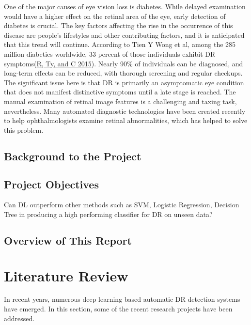 \documentclass[
]{article}
\begin{document}
One of the major causes of eye vision loss is diabetes. While delayed
examination would have a higher effect on the retinal area of the eye,
early detection of diabetes is crucial. The key factors affecting the
rise in the occurrence of this disease are people's lifestyles and other
contributing factors, and it is anticipated that this trend will
continue. According to Tien Y Wong et al, among the 285 million
diabetics worldwide, 33 percent of those individuals exhibit DR
symptoms(\protect\hyperlink{ref-r2015}{R, Ty, and C 2015}). Nearly 90\%
of individuals can be diagnosed, and long-term effects can be reduced,
with thorough screening and regular checkups. The significant issue here
is that DR is primarily an asymptomatic eye condition that does not
manifest distinctive symptoms until a late stage is reached. The manual
examination of retinal image features is a challenging and taxing task,
nevertheless. Many automated diagnostic technologies have been created
recently to help ophthalmologists examine retinal abnormalities, which
has helped to solve this problem.

\hypertarget{background-to-the-project}{%
\subsection{Background to the Project}\label{background-to-the-project}}

\hypertarget{project-objectives}{%
\subsection{Project Objectives}\label{project-objectives}}

Can DL outperform other methods such as SVM, Logistic Regression,
Decision Tree in producing a high performing classifier for DR on unseen
data?

\hypertarget{overview-of-this-report}{%
\subsection{Overview of This Report}\label{overview-of-this-report}}

\newpage

\hypertarget{literature-review}{%
\section{Literature Review}\label{literature-review}}

In recent years, numerous deep learning based automatic DR detection
systems have emerged. In this section, some of the recent research
projects have been addressed.
\end{document}
